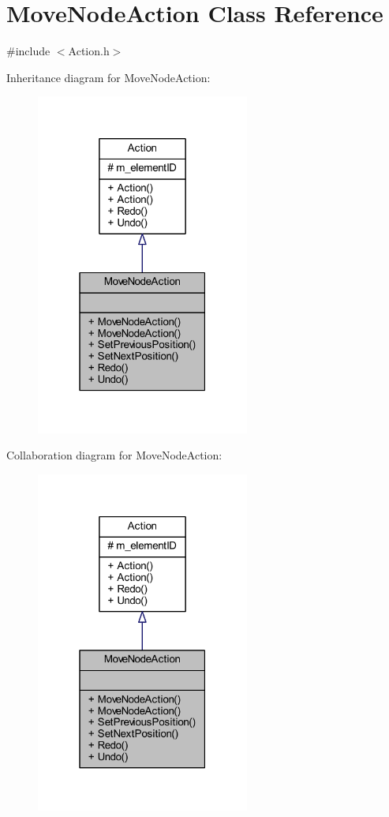 \hypertarget{class_move_node_action}{}\section{Move\+Node\+Action Class Reference}
\label{class_move_node_action}


{\ttfamily \#include $<$Action.\+h$>$}



Inheritance diagram for Move\+Node\+Action\+:\nopagebreak
\begin{figure}[H]
\begin{center}
\leavevmode
\includegraphics[width=199pt]{class_move_node_action__inherit__graph}
\end{center}
\end{figure}


Collaboration diagram for Move\+Node\+Action\+:\nopagebreak
\begin{figure}[H]
\begin{center}
\leavevmode
\includegraphics[width=199pt]{class_move_node_action__coll__graph}
\end{center}
\end{figure}
